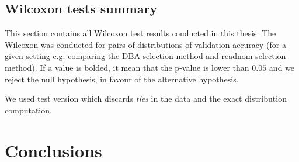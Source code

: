 \documentclass[a4paper,11pt,twoside]{report}
\theoremstyle{definition}
\begin{document}
\section{Wilcoxon tests summary}
This section contains all Wilcoxon test results conducted in this thesis. The Wilcoxon was conducted for pairs of distributions of validation accuracy (for a given setting e.g. comparing the DBA selection method and readnom selection method). If a value is bolded, it mean that the p-value is lower than $0.05$ and we reject the null hypothesis, in favour of the alternative hypothesis.

We used test version which discards \textit{ties} in the data and the exact distribution computation.

\begin{table}[!h]
\caption{Summary of statistical tests.}
\centering
\tabcolsep=0.11cm
\label{table:tests}
\end{table}
\chapter{Conclusions}
\end{document}
